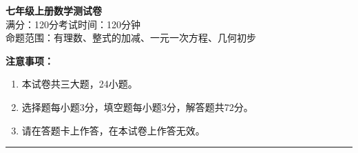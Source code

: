 \documentclass[12pt, a4paper]{ctexart}
\begin{document}
\begin{center}
{\LARGE\bfseries 七年级上册数学测试卷}\\[8pt]
{\large 满分：120分\quad 考试时间：120分钟}\\[4pt]
{\normalsize 命题范围：有理数、整式的加减、一元一次方程、几何初步}
\end{center}

\vspace{4pt}
\noindent\textbf{注意事项：}
\begin{enumerate}[leftmargin=2em]
\item 本试卷共三大题，24小题。
\item 选择题每小题3分，填空题每小题3分，解答题共72分。
\item 请在答题卡上作答，在本试卷上作答无效。
\end{enumerate}

\vspace{6pt}
\noindent\rule{\textwidth}{0.8pt}

\vspace{8pt}

\vspace{6pt}
\end{document}
